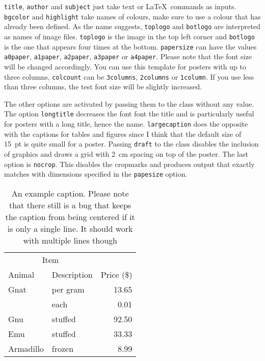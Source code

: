 \documentclass[
   ,highlight = dtublue
   ,toplogo   = {{tex_dtu_electro_b_uk}}
   ,botlogo   = {{DG_logo_CMYK_red-cropped}}
   ,toprightlogo = {{DTU-logo-blue-cmyk}}
   ,papersize = {{a0paper}}
   ,colcount  = {{2columns}}
   ,nocrop
]{dtuposter}
\begin{document}
\begin{dtupostercontent}
\texttt{title}, \texttt{author} and \texttt{subject} just take text or
\LaTeX\ commands as inputs. \texttt{bgcolor} and \texttt{highlight} take 
names of colours, make sure to use a colour that has already been defined.
As the name suggests, \texttt{toplogo} and \texttt{botlogo} are interpreted
as names of image files. \texttt{toplogo} is the image in the top left 
corner and \texttt{botlogo} is the one that appears four times at the bottom.
\texttt{papersize} can have the values \texttt{a0paper}, \texttt{a1paper}, 
\texttt{a2paper}, \texttt{a3paper} or \texttt{a4paper}. Please note that the 
font size will be changed accordingly. You can use this template for posters
with up to three columns, \texttt{colcount} can be \texttt{3columns}, 
\texttt{2columns} or \texttt{1column}. If you use less than three columns, 
the test font size will be slightly increased.

The other options are activated by passing them to the class without any value.
The option \texttt{longtitle} decreases the font font the title and is 
particularly useful for posters with a long title, hence the name. 
\texttt{largecaption} does the opposite with the captions for tables and figures 
since I think that the default size of \SI{15}{pt} is quite small for a poster. 
Passing \texttt{draft} to the class disables the inclusion of graphics and draws 
a grid with \SI{2}{\centi\metre} spacing on top of the poster. The last option
is \texttt{nocrop}. This disables the cropmarks and produces output that 
exactly matches with dimensions specified in the \texttt{papesize} option. 

\begin{table}
\caption{An example caption. Please note that there still is a bug that keeps the 
caption from being centered if it is only a single line. It should work with multiple
lines though}\label{tab:example}

\begin{tabular}{llr}
\toprule
\multicolumn{2}{c}{Item} \\
\cmidrule(r){1-2}
Animal    & Description & Price (\$) \\
\midrule
Gnat      & per gram    & 13.65      \\
          & each        & 0.01       \\
Gnu       & stuffed     & 92.50      \\
Emu       & stuffed     & 33.33      \\
Armadillo & frozen      & 8.99       \\
\bottomrule
\end{tabular}
\end{table}


\end{dtupostercontent}
\end{document}
